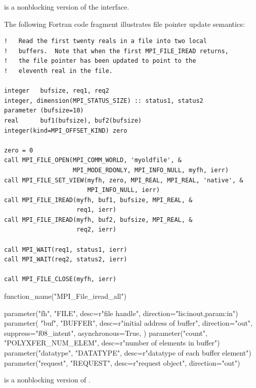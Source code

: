  is a nonblocking version of the  interface.

\begin{example}
\label{io-pointerupdate}
The following Fortran code fragment illustrates file pointer
update semantics:
\begin{lstlisting}[language={[MPI]Fortran}]
!   Read the first twenty reals in a file into two local
!   buffers.  Note that when the first MPI_FILE_IREAD returns,
!   the file pointer has been updated to point to the
!   eleventh real in the file.

integer   bufsize, req1, req2
integer, dimension(MPI_STATUS_SIZE) :: status1, status2
parameter (bufsize=10)
real      buf1(bufsize), buf2(bufsize)
integer(kind=MPI_OFFSET_KIND) zero

zero = 0
call MPI_FILE_OPEN(MPI_COMM_WORLD, 'myoldfile', &
                   MPI_MODE_RDONLY, MPI_INFO_NULL, myfh, ierr)
call MPI_FILE_SET_VIEW(myfh, zero, MPI_REAL, MPI_REAL, 'native', &
                       MPI_INFO_NULL, ierr)
call MPI_FILE_IREAD(myfh, buf1, bufsize, MPI_REAL, &
                    req1, ierr)
call MPI_FILE_IREAD(myfh, buf2, bufsize, MPI_REAL, &
                    req2, ierr)

call MPI_WAIT(req1, status1, ierr)
call MPI_WAIT(req2, status2, ierr)

call MPI_FILE_CLOSE(myfh, ierr)
\end{lstlisting}
\end{example}

%
%
\begin{mpi-binding}
    function_name("MPI_File_iread_all")
    
    parameter("fh", "FILE", desc=r"file handle", direction="lis:inout,param:in")
    parameter(
        "buf",
        "BUFFER",
        desc=r"initial address of buffer",
        direction="out",
        suppress="f08_intent",
        asynchronous=True,
    )
    parameter("count", "POLYXFER_NUM_ELEM", desc=r"number of elements in buffer")
    parameter("datatype", "DATATYPE", desc=r"datatype of each buffer element")
    parameter("request", "REQUEST", desc=r"request object", direction="out")
\end{mpi-binding}

 is a nonblocking version
of .

